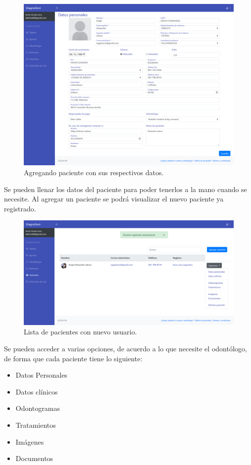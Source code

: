 \begin{figure}[H]
\centering
\includegraphics[width=17cm,keepaspectratio]{pictures/adminodo/pacientes/datos/datos-personales.png}
\caption{Agregando paciente con sus respectivos datos.}
\end{figure}

Se pueden llenar los datos del paciente para poder tenerlos a la mano cuando se necesite. Al agregar un paciente se podrá visualizar el nuevo paciente ya registrado.

\begin{figure}[H]
\centering
\includegraphics[width=17cm,keepaspectratio]{pictures/adminodo/pacientes/datos/lista-pacientes-2.png}
\caption{Lista de pacientes con nuevo usuario.}
\end{figure}

Se pueden acceder a varias opciones, de acuerdo a lo que necesite el odontólogo, de forma que cada paciente tiene lo siguiente:
\begin{itemize}
    \item Datos Personales
    \item Datos clínicos
    \item Odontogramas
    \item Tratamientos
    \item Imágenes
    \item Documentos
\end{itemize}

